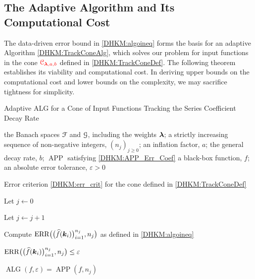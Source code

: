 \documentclass[USenglish]{article}
\theoremstyle{dgthm}
\theoremstyle{dgthm}
\theoremstyle{dgthm}
\theoremstyle{dgthm}
\theoremstyle{dgdef}
\theoremstyle{definition}
\DeclareMathOperator{\APP}{APP}
\DeclareMathOperator{\ALG}{ALG}
\DeclareMathOperator{\ERR}{ERR}
\newcommand{\dataNj}{\bigl(\hf(\bsk_i)\bigr)_{i=1}^{n_j}}
\newcommand{\ERRNj}{\ERR\bigl(\dataNj,n_j\bigr)}
\newcommand{\hf}{\widehat{f}}
\newcommand{\DHKMchange}[1]{{\color{red}{#1}}}
\begin{document}
\subsection{The Adaptive Algorithm and Its Computational Cost} \label{DHKM:SecAdapAlgTrackDecay}

The data-driven error bound in \eqref{DHKM:algoineq} forms the basis for an adaptive Algorithm \ref{DHKM:TrackConeAlg}, which solves our problem for input functions in the cone $\DHKMchange{\calC_{\boldsymbol{\lambda},a,b}}$ defined in \eqref{DHKM:TrackConeDef}.  The following theorem establishes its viability and computational cost. In deriving upper bounds on the computational cost and lower bounds on the complexity, we may sacrifice tightness for simplicity.

\begin{algorithm}
	\caption{Adaptive ALG for a Cone of Input Functions Tracking the Series Coefficient Decay Rate \label{DHKM:TrackConeAlg}}
	\begin{algorithmic}
	\PARAM the Banach spaces ${\mathcal{F}}$ and ${\mathcal{G}}$, including the weights ${\boldsymbol{\lambda}}$; a strictly increasing sequence of non-negative integers, $(n_j)_{j\ge 0}$; an inflation factor, $a$; the general decay rate, $b$; $\APP$ satisfying \eqref{DHKM:APP_Err_Coef}
		\INPUT a black-box function, $f$; an absolute error tolerance,
		$\varepsilon>0$

\Ensure Error criterion \eqref{DHKM:err_crit} for  the cone defined in \eqref{DHKM:TrackConeDef}

\State Let $j \leftarrow 0$
\Repeat

\State Let $j \leftarrow j + 1$

\State Compute $\ERRNj$ as defined in \eqref{DHKM:algoineq}

\Until $\ERRNj \le \varepsilon$

\RETURN $\ALG(f,\varepsilon) = \APP(f,n_{j})$
\end{algorithmic}
\end{algorithm}
\end{document}
